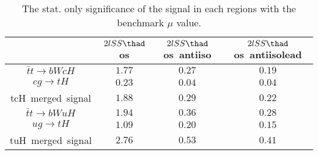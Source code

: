 \begin{table}
\caption{The stat. only significance of the signal in each regions with the benchmark $\mu$ value.}
\centering
\begin{tabular}{|c|c|c|c|} \hline
 & $2lSS\thad$ os & $2lSS\thad$ os~antiiso & $2lSS\thad$ os~antiisolead\\\hline
$\bar{t}t\to bWcH$ & $1.77$ & $0.27$ & $0.19$\\\hline
$cg\to tH$ & $0.23$ & $0.04$ & $0.04$\\\hline
tcH~merged~signal & $1.88$ & $0.29$ & $0.22$\\\hline
$\bar{t}t\to bWuH$ & $1.94$ & $0.36$ & $0.28$\\\hline
$ug\to tH$ & $1.09$ & $0.20$ & $0.15$\\\hline
tuH~merged~signal & $2.76$ & $0.53$ & $0.41$\\\hline
\end{tabular}
\label{tab:significance}
\end{table}
